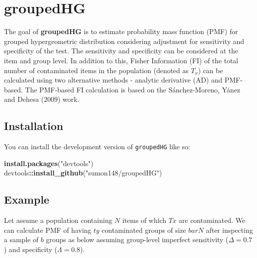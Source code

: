 \documentclass[
]{article}
\author{}
\date{\vspace{-2.5em}}
\newenvironment{Shaded}{\begin{snugshade}}{\end{snugshade}}
\newcommand{\FunctionTok}[1]{\textcolor[rgb]{0.13,0.29,0.53}{\textbf{#1}}}
\newcommand{\NormalTok}[1]{#1}
\newcommand{\SpecialCharTok}[1]{\textcolor[rgb]{0.81,0.36,0.00}{\textbf{#1}}}
\newcommand{\StringTok}[1]{\textcolor[rgb]{0.31,0.60,0.02}{#1}}
\begin{document}
\section{groupedHG}\label{groupedhg}

The goal of \textbf{groupedHG} is to estimate probability mass function
(PMF) for grouped hypergeometric distribution considering adjustment for
sensitivity and specificity of the test. The sensitivity and specificity
can be considered at the item and group level. In addition to this,
Fisher Information (FI) of the total number of contaminated items in the
population (denoted as \(T_x\)) can be calculated using two alternative
methods - analytic derivative (AD) and PMF-based. The PMF-based FI
calculation is based on the Sánchez-Moreno, Yánez and Dehesa (2009)
work.

\subsection{Installation}\label{installation}

You can install the development version of \texttt{groupedHG} like so:

\begin{Shaded}
\begin{Highlighting}[]
\FunctionTok{install.packages}\NormalTok{(}\StringTok{"devtools"}\NormalTok{)}
\NormalTok{devtools}\SpecialCharTok{::}\FunctionTok{install\_github}\NormalTok{(}\StringTok{"sumon148/groupedHG"}\NormalTok{)}
\end{Highlighting}
\end{Shaded}

\subsection{Example}\label{example}

Let assume a population containing \(N\) items of which \(Tx\) are
contaminated. We can calculate PMF of having \(ty\) contaminated groups
of size \(barN\) after inspecting a sample of \(b\) groups as below
assuming group-level imperfect sensitivity (\(\Delta=0.7\)) and
specificity (\(\Lambda=0.8\)).
\end{document}
